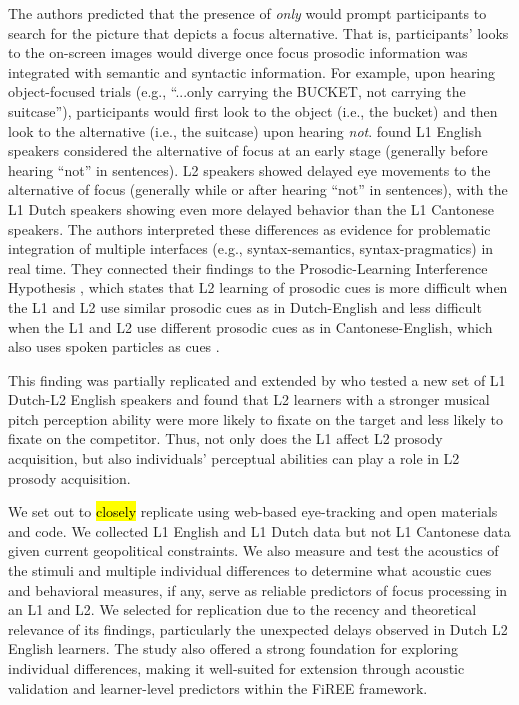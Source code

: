The authors predicted that the presence of \textit{only} would prompt participants to search for the picture that depicts a focus alternative. That is, participants' looks to the on-screen images would diverge once focus prosodic information was integrated with semantic and syntactic information. For example, upon hearing object-focused trials (e.g., “...only carrying the BUCKET, not carrying the suitcase”), participants would first look to the object (i.e., the bucket) and then look to the alternative (i.e., the suitcase) upon hearing \textit{not}. \textcite{ge2021a} found L1 English speakers considered the alternative of focus at an early stage (generally before hearing “not” in sentences). L2 speakers showed delayed eye movements to the alternative of focus (generally while or after hearing “not” in sentences), with the L1 Dutch speakers showing even more delayed behavior than the L1 Cantonese speakers. The authors interpreted these differences as evidence for problematic integration of multiple interfaces (e.g., syntax-semantics, syntax-pragmatics) in real time. They connected their findings to the Prosodic-Learning Interference Hypothesis \parencite{tremblay2016effects, tremblay2021re}, which states that L2 learning of prosodic cues is more difficult when the L1 and L2 use similar prosodic cues as in Dutch-English and less difficult when the L1 and L2 use different prosodic cues as in Cantonese-English, which also uses spoken particles as cues \parencite[see also][]{ge2021b}. 

This finding was partially replicated and extended by \textcite{jansen2023influence} who tested a new set of L1 Dutch-L2 English speakers and found that L2 learners with a stronger musical pitch perception ability were more likely to fixate on the target and less likely to fixate on the competitor. Thus, not only does the L1 affect L2 prosody acquisition, but also individuals' perceptual abilities can play a role in L2 prosody acquisition.

We set out to \hl{closely} replicate \textcite{ge2021a} using web-based eye-tracking and open materials and code. We collected L1 English and L1 Dutch data but not L1 Cantonese data given current geopolitical constraints. We also measure and test the acoustics of the stimuli and multiple individual differences to determine what acoustic cues and behavioral measures, if any, serve as reliable predictors of focus processing in an L1 and L2. We selected \textcite{ge2021a} for replication due to the recency and theoretical relevance of its findings, particularly the unexpected delays observed in Dutch L2 English learners. The study also offered a strong foundation for exploring individual differences, making it well-suited for extension through acoustic validation and learner-level predictors within the FiREE framework.

